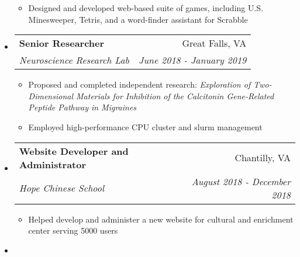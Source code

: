 \documentclass[letterpaper,11pt]{article}
\makeatletter
\newcommand{\resitem}[1]{\item #1 \vspace{-2pt}}
\newcommand{\ressubheading}[4]{
\begin{tabular*}{7.0in}{l@{\extracolsep{\fill}}r}
		\textbf{#1} & #2 \\
		\textit{#3} & \textit{#4} \\
\end{tabular*}\vspace{-6pt}}
\makeatother
\begin{document}
\begin{itemize}
	\begin{itemize}
		\resitem{Designed and developed web-based suite of games, including U.S. Minesweeper, Tetris, and a word-finder assistant for Scrabble}
	\end{itemize}
\item
	\ressubheading{Senior Researcher}{Great Falls, VA}{Neuroscience Research Lab}{June 2018 - January 2019}
	\begin{itemize}
		\resitem{Proposed and completed independent research: \textit{Exploration of Two-Dimensional Materials for Inhibition of the Calcitonin Gene-Related Peptide Pathway in Migraines}}
	    \resitem{Employed high-performance CPU cluster and slurm management}
    \end{itemize}
\item
    \ressubheading{Website Developer and Administrator}{Chantilly, VA}{Hope Chinese School}{August 2018 - December 2018}
	\begin{itemize}
	    \resitem{Helped develop and administer a new website for cultural and enrichment center serving 5000 users}
	\end{itemize}
\item

\end{itemize}
\end{document}
